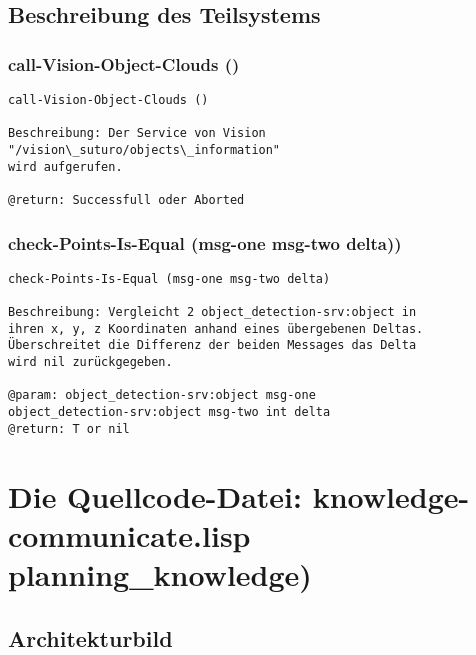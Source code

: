 \documentclass{suturo}
\begin{document}
\subsection{Beschreibung des Teilsystems}




\subsubsection{call-Vision-Object-Clouds ()}
\begin{verbatim}
call-Vision-Object-Clouds ()

Beschreibung: Der Service von Vision "/vision\_suturo/objects\_information"
wird aufgerufen.

@return: Successfull oder Aborted
\end{verbatim}


\subsubsection{check-Points-Is-Equal (msg-one msg-two delta))}
\begin{verbatim}
check-Points-Is-Equal (msg-one msg-two delta)

Beschreibung: Vergleicht 2 object_detection-srv:object in
ihren x, y, z Koordinaten anhand eines übergebenen Deltas.
Überschreitet die Differenz der beiden Messages das Delta
wird nil zurückgegeben.

@param: object_detection-srv:object msg-one 
object_detection-srv:object msg-two int delta
@return: T or nil
\end{verbatim}

\section{Die Quellcode-Datei: knowledge-communicate.lisp\\
planning\_knowledge)}

\subsection{Architekturbild}

\begin{figure}[!htb]
\end{figure}
\end{document}

